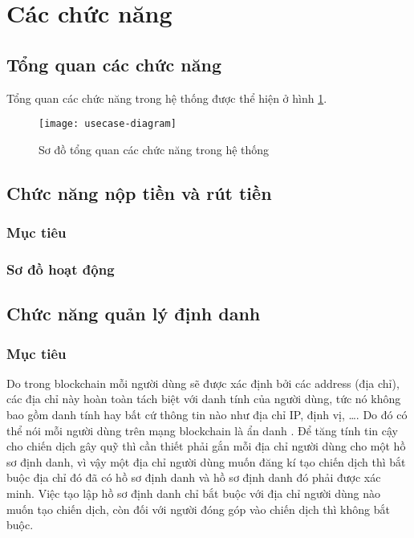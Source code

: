 \documentclass[../main-report.tex]{subfiles}
\begin{document}
\section{Các chức năng}
\subsection{Tổng quan các chức năng}
Tổng quan các chức năng trong hệ thống được thể hiện ở hình \ref{fig:usecase-diagram}.

\begin{figure}[ht!]
\begin{center}
\label{fig:usecase-diagram}
\texttt{[image: usecase-diagram]}
\caption{Sơ đồ tổng quan các chức năng trong hệ thống}
\end{center}
\end{figure}

\subsection{Chức năng nộp tiền và rút tiền}
\subsubsection{Mục tiêu}

\subsubsection{Sơ đồ hoạt động}

\subsection{Chức năng quản lý định danh}
\subsubsection{Mục tiêu}
Do trong \gls{blockchain} mỗi người dùng sẽ được xác định bởi các \gls{address} (địa chỉ), các địa chỉ này hoàn toàn tách biệt với danh tính của người dùng, tức nó không bao gồm danh tính hay bất cứ thông tin nào như địa chỉ IP, định vị, \ldots. Do đó có thể nói mỗi người dùng trên mạng \gls{blockchain} là ẩn danh \cite{henry2018blockchain}. Để tăng tính tin cậy cho chiến dịch gây quỹ thì cần thiết phải gắn mỗi địa chỉ người dùng cho một hồ sơ định danh, vì vậy một địa chỉ người dùng muốn đăng kí tạo chiến dịch thì bắt buộc địa chỉ đó đã có hồ sơ định danh và hồ sơ định danh đó phải được xác minh. Việc tạo lập hồ sơ định danh chỉ bắt buộc với địa chỉ người dùng nào muốn tạo chiến dịch, còn đối với người đóng góp vào chiến dịch thì không bắt buộc.
\end{document}
